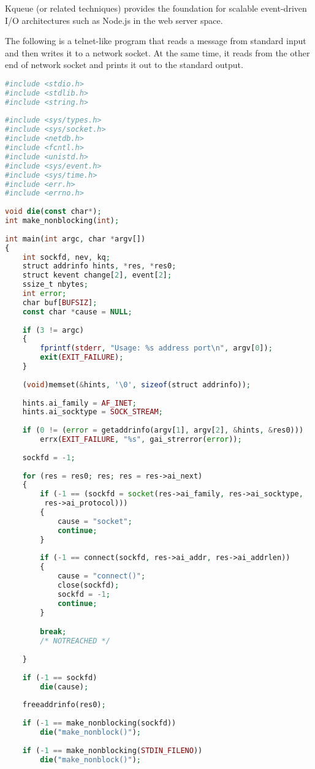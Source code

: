 Kqueue (or related techniques) provides the foundation for scalable event-driven I/O architectures such as Node.js in the web server space.

The following is a telnet-like program that reads a message from standard input and then writes it to a network socket. At the same time, it reads from the other end of network socket and prints it out to the standard output.

\begin{lstlisting}[language=PHP]
#include <stdio.h>
#include <stdlib.h>
#include <string.h>
 
#include <sys/types.h>
#include <sys/socket.h>
#include <netdb.h>
#include <fcntl.h>
#include <unistd.h>
#include <sys/event.h>
#include <sys/time.h>
#include <err.h>
#include <errno.h>
 
void die(const char*);
int make_nonblocking(int);
 
int main(int argc, char *argv[])
{
	int sockfd, nev, kq; 
	struct addrinfo hints, *res, *res0; 
	struct kevent change[2], event[2]; 
	ssize_t nbytes;	
	int error; 
	char buf[BUFSIZ]; 
	const char *cause = NULL;
 
	if (3 != argc)
	{
		fprintf(stderr, "Usage: %s address port\n", argv[0]);
		exit(EXIT_FAILURE);
	}
 
	(void)memset(&hints, '\0', sizeof(struct addrinfo));
 
	hints.ai_family = AF_INET;
	hints.ai_socktype = SOCK_STREAM;
 
	if (0 != (error = getaddrinfo(argv[1], argv[2], &hints, &res0)))
		errx(EXIT_FAILURE, "%s", gai_strerror(error));
 
	sockfd = -1;
 
	for (res = res0; res; res = res->ai_next)
	{
		if (-1 == (sockfd = socket(res->ai_family, res->ai_socktype,
		 res->ai_protocol)))
		{
			cause = "socket";
			continue;
		}
 
		if (-1 == connect(sockfd, res->ai_addr, res->ai_addrlen))
		{
			cause = "connect()";
			close(sockfd);
			sockfd = -1;
			continue;
		}

		break;
		/* NOTREACHED */
 
	}
 
	if (-1 == sockfd)
		die(cause);
		
	freeaddrinfo(res0);
 
	if (-1 == make_nonblocking(sockfd))
		die("make_nonblock()");
 
	if (-1 == make_nonblocking(STDIN_FILENO))
		die("make_nonblock()");
 

\end{lstlisting}
